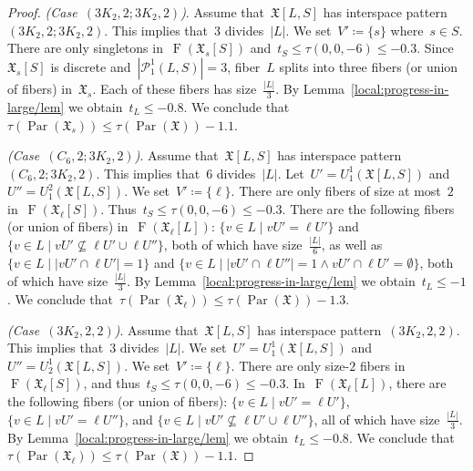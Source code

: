 \documentclass[english,a4paper]{article}
\theoremstyle{plain}
\theoremstyle{definition}
\newcommand{\abs}[1]{| #1 |}
\DeclareMathOperator{\Fibers}{F}
\newcommand{\coherentConfig}{\ensuremath{\mathfrak{X}}}
\newcommand{\fibers}[1]{\ensuremath{\Fibers \left( #1 \right)}}
\newcommand{\interspace}[2]{\ensuremath{\coherentConfig[#1,#2]}}
\newcommand{\partition}[1]{\ensuremath{\mathcal{P}^1_1(#1)}}
\DeclareMathOperator{\parameters}{Par}
\newcommand{\ipsixMatchingTwice}        {\ensuremath{(\disjointCliques{3}{2},2,2)}}
\newcommand{\ipsixMatchingMatching}     {\ensuremath{(\disjointCliques{3}{2},2;\disjointCliques{3}{2},2)}}
\newcommand{\ipsixMatchingAndCycle}     {\ensuremath{(\cycle{6},2;\disjointCliques{3}{2},2)}}
\newcommand{\clique}[1]{\ensuremath{K_{#1}}}
\newcommand{\cycle}[1]{\ensuremath{C_{#1}}}
\newcommand{\disjointCliques}[2]{\ensuremath{#1 \clique{#2}}}
\begin{document}
\begin{proof}
    \textit{(Case~$\ipsixMatchingMatching$)}.
    Assume that~$\interspace{L}{S}$ has interspace pattern~$\ipsixMatchingMatching$.
    This implies that~$3$ divides~$|L|$.
    We set~$V' \coloneqq \{s\}$ where~$s \in S$.
    There are only singletons in~$\fibers{\coherentConfig_{s}[S]}$ and~$t_S \leq \tau(0,0,-6) \leq -0.3$.
    Since~$\coherentConfig_s[S]$ is discrete and~$|\partition{L,S}| = 3$, fiber~$L$ splits into three fibers (or union of fibers) in~$\coherentConfig_{s}$.
    Each of these fibers has size~$\frac{\abs{L}}{3}$.
    By Lemma~\ref{local:progress-in-large/lem} we obtain~$t_L \leq -0.8$.
    We conclude that~$\tau(\parameters(\coherentConfig_{s})) \leq \tau(\parameters(\coherentConfig))- 1.1$.


    \textit{(Case~$\ipsixMatchingAndCycle$)}.
    Assume that~$\interspace{L}{S}$ has interspace pattern~$\ipsixMatchingAndCycle$.
    This implies that~$6$ divides~$|L|$.
    Let~$U' = U^1_1(\interspace{L}{S})$ and~$U'' = U^2_1(\interspace{L}{S})$.
    We set~$V' \coloneqq \{\ell\}$.
    There are only fibers of size at most~$2$ in~$\fibers{\coherentConfig_\ell[S]}$.
    Thus~$t_S \leq \tau(0,0,-6) \leq -0.3$.
    There are the following fibers (or union of fibers) in~$\fibers{\coherentConfig_\ell[L]}$:
    $\{v \in L \mid vU' = \ell U'\}$ and
    $\{v \in L \mid vU' \not\subseteq \ell U' \cup \ell U''\}$, both of which have size~$\frac{\abs{L}}{6}$, as well as
    $\{v \in L \mid \abs{vU' \cap \ell U' } = 1 \}$ and
    $\{v \in L \mid \abs{vU' \cap \ell U''} = 1 \wedge vU' \cap \ell U' = \emptyset \}$, both of which have size~$\frac{\abs{L}}{3}$.
    By Lemma~\ref{local:progress-in-large/lem} we obtain~$t_L \leq -1$.
    We conclude that~$\tau(\parameters(\coherentConfig_\ell)) \leq \tau(\parameters(\coherentConfig))- 1.3$.


    \textit{(Case~$\ipsixMatchingTwice$)}.
    Assume that~$\interspace{L}{S}$ has interspace pattern~$\ipsixMatchingTwice$. This implies that~$3$ divides~$|L|$.
    We set~$U' = U^1_1(\interspace{L}{S})$ and~$U'' = U^1_2(\interspace{L}{S})$.
    We set~$V' \coloneqq \{\ell\}$.
    There are only size-$2$ fibers in~$\fibers{\coherentConfig_\ell[S]}$, and thus~$t_S \leq \tau(0,0,-6) \leq -0.3$.
    In~$\fibers{\coherentConfig_\ell[L]}$, there are the following fibers (or union of fibers):
    $\{v \in L \mid vU' = \ell U' \}$,
    $\{v \in L \mid vU' = \ell U''\}$, and
    $\{v \in L \mid vU' \not\subseteq \ell U' \cup \ell U''\}$,
    all of which have size~$\frac{\abs{L}}{3}$.
    By Lemma~\ref{local:progress-in-large/lem} we obtain~$t_L \leq -0.8$.
    We conclude that~$\tau(\parameters(\coherentConfig_\ell)) \leq \tau(\parameters(\coherentConfig))- 1.1$.


\end{proof}
\end{document}
